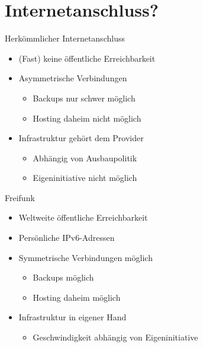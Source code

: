 \documentclass{beamer}
\begin{document}
	\section{Internetanschluss?}
	\begin{frame}{Herkömmlicher Internetanschluss}
	  \begin{itemize}
		\item (Fast) keine öffentliche Erreichbarkeit
		\item Asymmetrische Verbindungen
		\begin{itemize}
		  \item Backups nur schwer möglich
		  \item Hosting daheim nicht möglich
		\end{itemize}
		\item Infrastruktur gehört dem Provider
		\begin{itemize}
		  \item Abhängig von Ausbaupolitik
		  \item Eigeninitiative nicht möglich
		\end{itemize}
	  \end{itemize}
	\end{frame}

	\begin{frame}{Freifunk}
	  \begin{itemize}
		\item Weltweite öffentliche Erreichbarkeit
		\item Persönliche IPv6-Adressen
		\item Symmetrische Verbindungen möglich
		\begin{itemize}
		  \item Backups möglich
		  \item Hosting daheim möglich
		\end{itemize}
		\item Infrastruktur in eigener Hand
		\begin{itemize}
		  \item Geschwindigkeit abhängig von Eigeninitiative
		\end{itemize}
	  \end{itemize}

	\end{frame}

\end{document}
